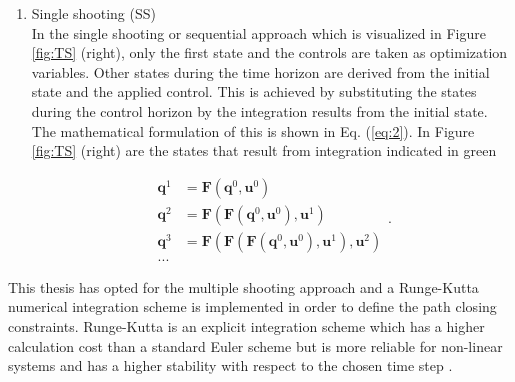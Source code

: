 \begin{enumerate}
%	
	\item Single shooting (SS)\\  
	In the single shooting or sequential approach which is visualized in Figure \ref{fig:TS} (right), only the first state and the controls are taken as optimization variables. Other states during the time horizon are derived from the initial state and the applied control. This is achieved by substituting the states during the control horizon by the integration results from the initial state. The mathematical formulation of this is shown in Eq. (\ref{eq:2}). In Figure \ref{fig:TS} (right) are the states that result from integration indicated in green \cite{Gillis2019}
	
	\begin{equation}\label{eq:2}
	\begin{aligned}
	\bm{q}^1 &= \bm{F}(\bm{q}^0, \bm{u}^0)\\
	\bm{q}^2 &= \bm{F}(\bm{F}(\bm{q}^0, \bm{u}^0), \bm{u}^1)\\
	\bm{q}^3 &= \bm{F}(\bm{F}(\bm{F}(\bm{q}^0, \bm{u}^0), \bm{u}^1), \bm{u}^2)\\
	...
	\end{aligned}.
	\end{equation}
\end{enumerate}

This thesis has opted for the multiple shooting approach and a Runge-Kutta numerical integration scheme is implemented in order to define the path closing constraints. Runge-Kutta is an explicit integration scheme which has a higher calculation cost than a standard Euler scheme but is more reliable for non-linear systems and has a higher stability with respect to the chosen time step \cite{Mercy2018}.

